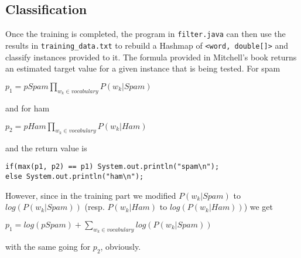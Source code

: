 \documentclass[12pt,a4paper]{report}
\begin{document}
\subsection{Classification}
Once the training is completed, the program in \texttt{filter.java} can then use the results in \texttt{training\_data.txt} to rebuild a Hashmap of \texttt{<word, double[]>} and classify instances provided to it. The formula provided in Mitchell's book returns an estimated target value for a given instance that is being tested. For spam
\begin{center}
$ p_1 = pSpam\prod\limits_{w_k \in vocabulary}P(w_k|Spam)$
\end{center} 
and for ham
\begin{center}
$ p_2 = pHam\prod\limits_{w_k \in vocabulary}P(w_k|Ham)$
\end{center} 
and the return value is 
\begin{lstlisting}
if(max(p1, p2) == p1) System.out.println("spam\n");
else System.out.println("ham\n");
\end{lstlisting}
However, since in the training part we modified $P(w_k|Spam)$ to $log(P(w_k|Spam))$ (resp. $P(w_k|Ham)$ to $log(P(w_k|Ham))$) we get 
\begin{center}
$ p_1 = log(pSpam) + \sum\limits_{w_k \in vocabulary}log(P(w_k|Spam))$
\end{center}
with the same going for $p_2$, obviously.
\end{document}
